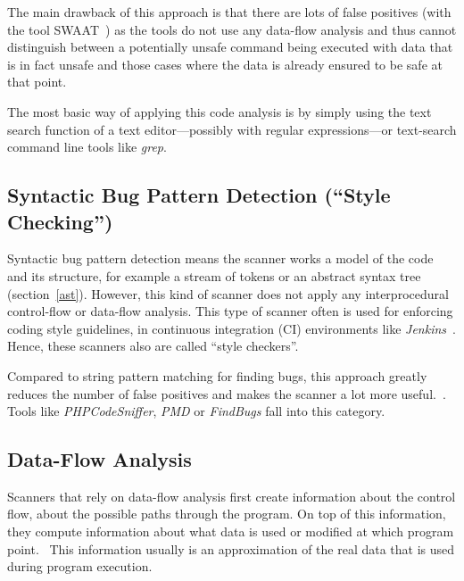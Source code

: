 The main drawback of this approach is that there are lots of false positives (\eg with the tool SWAAT~\cite{swaat}) as the tools do not use any data-flow analysis and thus cannot distinguish between a potentially unsafe command being executed with data that is in fact unsafe and those cases where the data is already ensured to be safe at that point.

The most basic way of applying this code analysis is by simply using the text search function of a text editor---possibly with regular expressions---or text-search command line tools like \emph{grep}.


\subsection{Syntactic Bug Pattern Detection (``Style Checking'')}

Syntactic bug pattern detection means the scanner works a model of the code and its structure, for example a stream of tokens or an abstract syntax tree (section~\ref{ast}). However, this kind of scanner does not apply any interprocedural control-flow or data-flow analysis. This type of scanner often is used for enforcing coding style guidelines, \eg in continuous integration (CI) environments like \emph{Jenkins}~\cite{jenkins}. Hence, these scanners also are called ``style checkers''.

Compared to string pattern matching for finding bugs, this approach greatly reduces the number of false positives and makes the scanner a lot more useful.~\cite{comparison-of-bug-finding-tools}. Tools like \emph{PHPCodeSniffer}, \emph{PMD} or \emph{FindBugs} fall into this category.


\subsection{Data-Flow Analysis}

Scanners that rely on data-flow analysis first create information about the control flow, \ie about the possible paths through the program. On top of this information, they compute information about what data is used or modified at which program point.~\cite{data-flow-analysis} This information usually is an approximation of the real data that is used during program execution.

